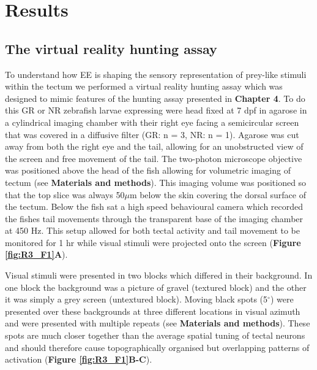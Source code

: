 \section{Results}
\subsection{The virtual reality hunting assay}
To understand how EE is shaping the sensory representation of prey-like stimuli within the tectum we performed a virtual reality hunting assay which was  designed to mimic features of the hunting assay presented in \textbf{Chapter 4}. To do this GR or NR zebrafish larvae expressing  were head fixed at 7 \gls{dpf} in agarose in a cylindrical imaging chamber with their right eye facing a semicircular screen that was covered in a diffusive filter (GR: n = 3, NR: n = 1). Agarose was cut away from both the right eye and the tail, allowing for an unobstructed view of the screen and free movement of the tail. The two-photon microscope objective was positioned above the head of the fish allowing for volumetric imaging of tectum (see \textbf{Materials and methods}). This imaging volume was positioned so that the top slice was always 50$\mu$m below the skin covering the dorsal surface of the tectum. Below the fish sat a high speed behavioural camera which recorded the fishes tail movements through the transparent base of the imaging chamber at 450 Hz. This setup allowed for both tectal activity and tail movement to be monitored for 1 hr while visual stimuli were projected onto the screen (\textbf{Figure \ref{fig:R3_F1}A}). 

Visual stimuli were presented in two blocks which differed in their background. In one block the background was a picture of gravel (textured block) and the other it was simply a grey screen (untextured block). Moving black spots (5$^{\circ}$) were presented over these backgrounds at three different locations in visual azimuth and were presented with multiple repeats (see \textbf{Materials and methods}).  These spots are much closer together than the average spatial tuning of tectal neurons and should therefore cause topographically organised but overlapping patterns of activation (\textbf{Figure \ref{fig:R3_F1}B-C}).

